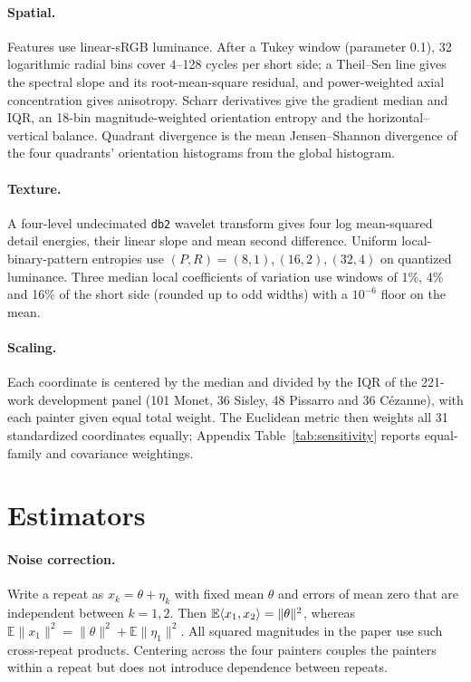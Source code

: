 \paragraph{Spatial.} Features use linear-sRGB luminance. After a Tukey window
(parameter 0.1), 32 logarithmic radial bins cover 4--128 cycles per short side; a
Theil--Sen line gives the spectral slope and its root-mean-square residual, and
power-weighted axial concentration gives anisotropy. Scharr derivatives give the
gradient median and IQR, an 18-bin magnitude-weighted orientation entropy and the
horizontal--vertical balance. Quadrant divergence is the mean Jensen--Shannon
divergence of the four quadrants' orientation histograms from the global histogram.

\paragraph{Texture.} A four-level undecimated \texttt{db2} wavelet transform
\citep{mallat1989wavelet} gives four log mean-squared detail energies, their linear
slope and mean second difference. Uniform local-binary-pattern entropies
\citep{ojala2002lbp} use $(P,R)=(8,1),(16,2),(32,4)$ on quantized luminance. Three
median local coefficients of variation use windows of 1\%, 4\% and 16\% of the short
side (rounded up to odd widths) with a $10^{-6}$ floor on the mean.

\paragraph{Scaling.} Each coordinate is centered by the median and divided by the IQR
of the 221-work development panel (101 Monet, 36 Sisley, 48 Pissarro and 36
C\'ezanne), with each painter given equal total weight. The Euclidean metric then
weights all 31 standardized coordinates equally; Appendix Table~\ref{tab:sensitivity}
reports equal-family and covariance weightings.

\FloatBarrier
\section{Estimators}\label{app:estimators}

\paragraph{Noise correction.} Write a repeat as $x_k=\theta+\eta_k$ with fixed mean
$\theta$ and errors of mean zero that are independent between $k=1,2$. Then
$\mathbb E\langle x_1,x_2\rangle=\|\theta\|^2$, whereas
$\mathbb E\|x_1\|^2=\|\theta\|^2+\mathbb E\|\eta_1\|^2$. All squared magnitudes in the
paper use such cross-repeat products. Centering across the four painters couples
the painters within a repeat but does not introduce dependence between repeats.

